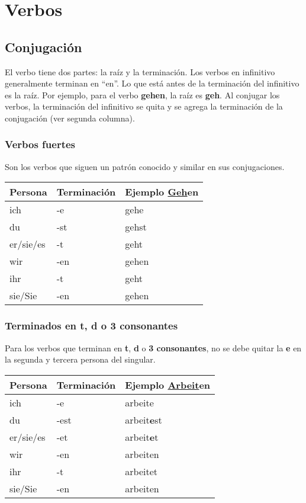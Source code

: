 \chapter{Verbos}

\section{Conjugación}
El verbo tiene dos partes: la raíz y la terminación. Los verbos en infinitivo generalmente terminan en ``en''. Lo que está antes de la terminación del infinitivo es la raíz. Por ejemplo, para el verbo \textbf{gehen}, la raíz es \textbf{geh}. Al conjugar los verbos, la terminación del infinitivo se quita y se agrega la terminación de la conjugación (ver segunda columna).

\subsection{Verbos fuertes}
Son los verbos que siguen un patrón conocido y similar en sus conjugaciones.

\begin{tabular}{| l | l l |}
\hline
\textbf{Persona} & \textbf{Terminación} & \textbf{Ejemplo \underline{Geh}en}\\
\hline
ich & -e & gehe\\
du & -st & gehst\\
er/sie/es & -t & geht\\
wir & -en & gehen\\
ihr & -t & geht \\
sie/Sie & -en & gehen \\
\hline
\end{tabular}

\subsection{Terminados en t, d o 3 consonantes}
Para los verbos que terminan en \textbf{t}, \textbf{d} o \textbf{3 consonantes}, no se debe quitar la \textbf{e} en la segunda y tercera persona del singular.

\begin{tabular}{| l | l l |}
\hline
\textbf{Persona} & \textbf{Terminación} & \textbf{Ejemplo \underline{Arbeit}en}\\
\hline
ich & -e & arbeite\\
du & -est & arbeit\textbf{e}st\\
er/sie/es & -et & arbeit\textbf{e}t \\
wir & -en & arbeiten\\
ihr & -t & arbeitet \\
sie/Sie & -en & arbeiten \\
\hline
\end{tabular}

